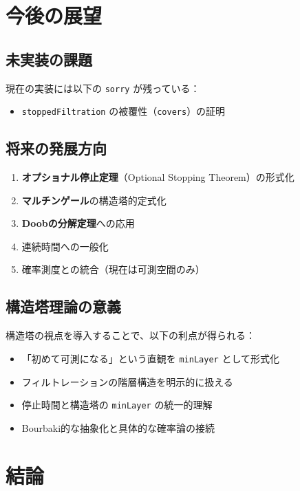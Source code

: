 \documentclass[a4paper,12pt]{ltjsarticle}
\theoremstyle{definition}
\begin{document}
\section{今後の展望}

\subsection{未実装の課題}

現在の実装には以下の \texttt{sorry} が残っている：
\begin{itemize}
  \item \texttt{stoppedFiltration} の被覆性（\texttt{covers}）の証明
\end{itemize}

\subsection{将来の発展方向}

\begin{enumerate}
  \item \textbf{オプショナル停止定理}（Optional Stopping Theorem）の形式化
  \item \textbf{マルチンゲール}の構造塔的定式化
  \item \textbf{Doobの分解定理}への応用
  \item 連続時間への一般化
  \item 確率測度との統合（現在は可測空間のみ）
\end{enumerate}

\subsection{構造塔理論の意義}

構造塔の視点を導入することで、以下の利点が得られる：
\begin{itemize}
  \item 「初めて可測になる」という直観を \texttt{minLayer} として形式化
  \item フィルトレーションの階層構造を明示的に扱える
  \item 停止時間と構造塔の \texttt{minLayer} の統一的理解
  \item Bourbaki的な抽象化と具体的な確率論の接続
\end{itemize}

\section{結論}
\end{document}
